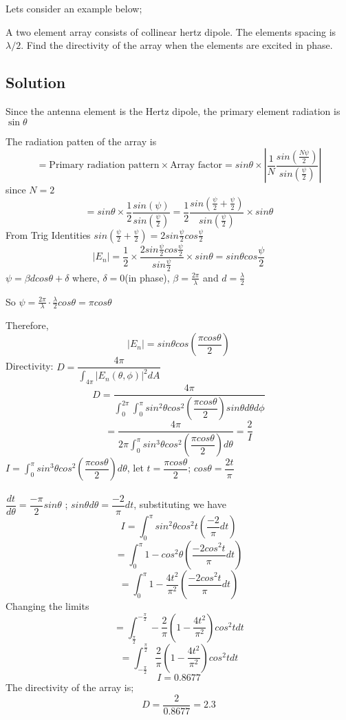 Lets consider an example below;
\begin{exmp}
A two element array consists of collinear hertz dipole. The elements spacing is $\lambda/2$. Find the directivity of the array when the elements are excited in phase. 
\subsection*{\centering Solution} 
Since the antenna element is the Hertz dipole, the primary element radiation is $\sin\theta$ 

The radiation patten of the array is
\begin{dmath*}
= \text{Primary radiation pattern} \times \text{Array factor}= sin\theta \times \left|\dfrac{1}{N} \dfrac{sin(\frac{N \psi}{2})}{sin(\frac{\psi}{2})}\right|
\end{dmath*}
since $N = 2$ 
$$ = sin\theta \times \dfrac{1}{2} \dfrac{sin( \psi)}{sin(\frac{\psi}{2})} = \dfrac{1}{2} \dfrac{sin(\frac{\psi}{2}+ \frac{\psi}{2})}{sin(\frac{\psi}{2})} \times sin\theta $$ 
From Trig Identities $sin(\frac{\psi}{2}+ \frac{\psi}{2}) = 2sin\frac{\psi}{2}cos\frac{\psi}{2}$
$$ |E_{n}| = \dfrac{1}{2} \times \dfrac{2sin\frac{\psi}{2}cos\frac{\psi}{2}}{sin\frac{\psi}{2}}  \times sin\theta = sin\theta cos\frac{\psi}{2}	$$
$\psi = \beta dcos\theta +  \delta $ where, $\delta = 0$(in phase), $\beta = \frac{2\pi}{\lambda}$ and $ d = \frac{\lambda}{2} $

So $\psi = \frac{2\pi}{\lambda} \cdot \frac{\lambda}{2} cos\theta  = \pi cos\theta$ 

Therefore, $$|E_{n}| = sin\theta cos\left(\dfrac{\pi cos\theta}{2}\right) $$ 
Directivity: $ D = \dfrac{4\pi}{\int_{4\pi}|E_{n}(\theta, \phi)|^2 dA}$ 
$$ D = \dfrac{4\pi}{\int_{0}^{2\pi}\int_{0}^{\pi} sin^2\theta cos^2\left(\dfrac{\pi cos\theta}{2}\right)sin\theta d\theta d\phi}$$  $$ = \dfrac{4\pi}{ 2\pi \int_{0}^{\pi} sin^3\theta cos^2\left(\dfrac{\pi cos\theta}{2}\right) d\theta} = \dfrac{2}{I}$$
$ I = \int_{0}^{\pi} sin^3\theta cos^2\left(\dfrac{\pi cos\theta}{2}\right) d\theta $, 
let $t = \dfrac{\pi cos\theta}{2} $; $ cos\theta = \dfrac{2t}{\pi}$ \\ \\
$\dfrac{dt}{d\theta} = \dfrac{- \pi}{2} sin\theta $ ; $sin\theta d\theta = \dfrac{-2}{\pi}dt$, substituting we have
$$  I = \int_{0}^{\pi} sin^2\theta cos^2t\left(\dfrac{-2}{\pi}dt\right) $$
$$ = \int_{0}^{\pi} 1 - cos^2\theta \left(\dfrac{-2 cos^2 t}{\pi} dt\right) $$ 
$$  = \int_{0}^{\pi} 1 - \dfrac{4t^2}{\pi^2} \left(\dfrac{-2 cos^2 t}{\pi} dt\right)$$
Changing the limits
$$  = \int_{\frac{\pi}{2}}^{-\frac{\pi}{2}} -\dfrac{2}{\pi}\left(1 - \dfrac{4t^2}{\pi^2}\right) cos^2t dt$$
$$  = \int_{-\frac{\pi}{2}}^{\frac{\pi}{2}} \dfrac{2}{\pi}\left(1 - \dfrac{4t^2}{\pi^2}\right) cos^2t dt$$
$$ I = 0.8677 $$ 
The directivity of the array  is; 
$$ D = \dfrac{2}{0.8677} = 2.3 $$ 
\end{exmp}

